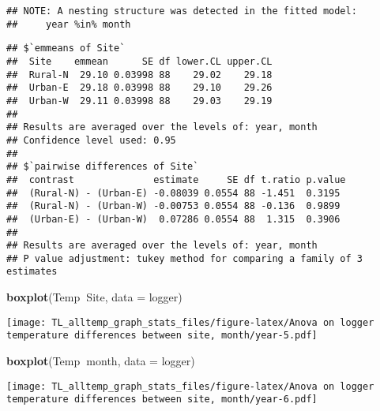 \documentclass[
]{article}
\newenvironment{Shaded}{\begin{snugshade}}{\end{snugshade}}
\newcommand{\DataTypeTok}[1]{\textcolor[rgb]{0.13,0.29,0.53}{#1}}
\newcommand{\DecValTok}[1]{\textcolor[rgb]{0.00,0.00,0.81}{#1}}
\newcommand{\KeywordTok}[1]{\textcolor[rgb]{0.13,0.29,0.53}{\textbf{#1}}}
\newcommand{\NormalTok}[1]{#1}
\newcommand{\OperatorTok}[1]{\textcolor[rgb]{0.81,0.36,0.00}{\textbf{#1}}}
\newcommand{\StringTok}[1]{\textcolor[rgb]{0.31,0.60,0.02}{#1}}
\begin{document}
\begin{verbatim}
## NOTE: A nesting structure was detected in the fitted model:
##     year %in% month
\end{verbatim}

\begin{verbatim}
## $`emmeans of Site`
##  Site    emmean      SE df lower.CL upper.CL
##  Rural-N  29.10 0.03998 88    29.02    29.18
##  Urban-E  29.18 0.03998 88    29.10    29.26
##  Urban-W  29.11 0.03998 88    29.03    29.19
## 
## Results are averaged over the levels of: year, month 
## Confidence level used: 0.95 
## 
## $`pairwise differences of Site`
##  contrast              estimate     SE df t.ratio p.value
##  (Rural-N) - (Urban-E) -0.08039 0.0554 88 -1.451  0.3195 
##  (Rural-N) - (Urban-W) -0.00753 0.0554 88 -0.136  0.9899 
##  (Urban-E) - (Urban-W)  0.07286 0.0554 88  1.315  0.3906 
## 
## Results are averaged over the levels of: year, month 
## P value adjustment: tukey method for comparing a family of 3 estimates
\end{verbatim}

\begin{Shaded}
\begin{Highlighting}[]
\KeywordTok{boxplot}\NormalTok{(Temp}\OperatorTok{~}\NormalTok{Site, }\DataTypeTok{data =}\NormalTok{ logger)}
\end{Highlighting}
\end{Shaded}

\texttt{[image: TL\_alltemp\_graph\_stats\_files/figure-latex/Anova on logger temperature differences between site, month/year-5.pdf]}

\begin{Shaded}
\begin{Highlighting}[]
\KeywordTok{boxplot}\NormalTok{(Temp}\OperatorTok{~}\NormalTok{month, }\DataTypeTok{data =}\NormalTok{ logger)}
\end{Highlighting}
\end{Shaded}

\texttt{[image: TL\_alltemp\_graph\_stats\_files/figure-latex/Anova on logger temperature differences between site, month/year-6.pdf]}

\begin{Shaded}
\end{Shaded}
\end{document}
